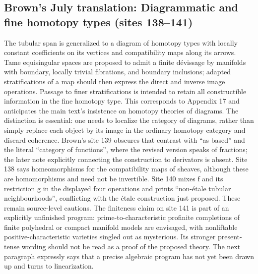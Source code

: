 \subsection*{Brown's July translation: Diagrammatic and fine homotopy types (sites 138--141)}
The tubular span is generalized to a diagram of homotopy types with locally constant coefficients on its vertices and compatibility maps along its arrows. Tame equisingular spaces are proposed to admit a finite dévissage by manifolds with boundary, locally trivial fibrations, and boundary inclusions; adapted stratifications of a map should then express the direct and inverse image operations. Passage to finer stratifications is intended to retain all constructible information in the fine homotopy type. This corresponds to Appendix 17 and anticipates the main text's insistence on homotopy theories of diagrams. The distinction is essential: one needs to localize the category of diagrams, rather than simply replace each object by its image in the ordinary homotopy category and discard coherence. Brown's site 139 obscures that contrast with ``as based'' and the literal ``category of functions'', where the revised version speaks of fractions; the later note explicitly connecting the construction to derivators is absent. Site 138 says homeomorphisms for the compatibility maps of sheaves, although these are homomorphisms and need not be invertible. Site 140 mixes f and its restriction g in the displayed four operations and prints ``non-étale tubular neighbourhoods'', conflicting with the étale construction just proposed. These remain source-level cautions. The finiteness claim on site 141 is part of an explicitly unfinished program: prime-to-characteristic profinite completions of finite polyhedral or compact manifold models are envisaged, with nonliftable positive-characteristic varieties singled out as mysterious. Its stronger present-tense wording should not be read as a proof of the proposed theory. The next paragraph expressly says that a precise algebraic program has not yet been drawn up and turns to linearization.

